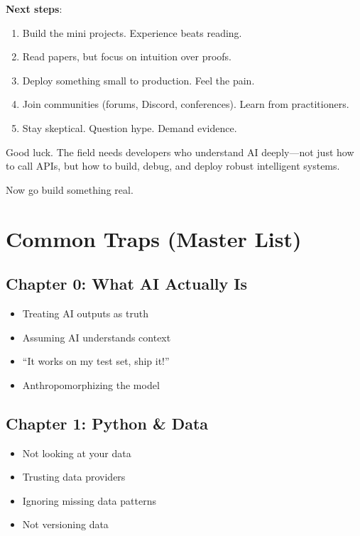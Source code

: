 \documentclass[11pt,oneside]{book}
\newcommand{\blankpage}{%
    \clearpage
    \thispagestyle{empty}
    \mbox{}
    \clearpage
}
\begin{document}
\textbf{Next steps}:
\begin{enumerate}
\item Build the mini projects. Experience beats reading.
\item Read papers, but focus on intuition over proofs.
\item Deploy something small to production. Feel the pain.
\item Join communities (forums, Discord, conferences). Learn from practitioners.
\item Stay skeptical. Question hype. Demand evidence.
\end{enumerate}

Good luck. The field needs developers who understand AI deeply---not just how to call APIs, but how to build, debug, and deploy robust intelligent systems.

Now go build something real.

\blankpage



\appendix

\chapter{Common Traps (Master List)}

\section{Chapter 0: What AI Actually Is}

\begin{itemize}
    \item Treating AI outputs as truth
    \item Assuming AI understands context
    \item ``It works on my test set, ship it!''
    \item Anthropomorphizing the model
\end{itemize}

\section{Chapter 1: Python \& Data}

\begin{itemize}
    \item Not looking at your data
    \item Trusting data providers
    \item Ignoring missing data patterns
    \item Not versioning data
\end{itemize}
\end{document}
